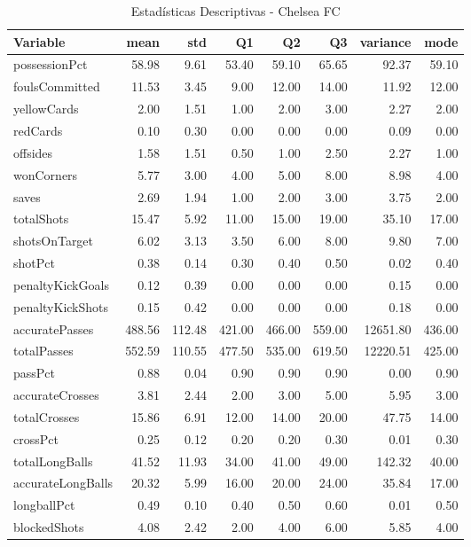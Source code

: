 \begin{table}[H]
\centering
\caption{Estadísticas Descriptivas - Chelsea FC}
\label{tab:eng_chelsea}
\small
\begin{tabular}{lrrrrrrr}
\hline
Variable & mean & std & Q1 & Q2 & Q3 & variance & mode \\
\hline
possessionPct & 58.98 & 9.61 & 53.40 & 59.10 & 65.65 & 92.37 & 59.10 \\
foulsCommitted & 11.53 & 3.45 & 9.00 & 12.00 & 14.00 & 11.92 & 12.00 \\
yellowCards & 2.00 & 1.51 & 1.00 & 2.00 & 3.00 & 2.27 & 2.00 \\
redCards & 0.10 & 0.30 & 0.00 & 0.00 & 0.00 & 0.09 & 0.00 \\
offsides & 1.58 & 1.51 & 0.50 & 1.00 & 2.50 & 2.27 & 1.00 \\
wonCorners & 5.77 & 3.00 & 4.00 & 5.00 & 8.00 & 8.98 & 4.00 \\
saves & 2.69 & 1.94 & 1.00 & 2.00 & 3.00 & 3.75 & 2.00 \\
totalShots & 15.47 & 5.92 & 11.00 & 15.00 & 19.00 & 35.10 & 17.00 \\
shotsOnTarget & 6.02 & 3.13 & 3.50 & 6.00 & 8.00 & 9.80 & 7.00 \\
shotPct & 0.38 & 0.14 & 0.30 & 0.40 & 0.50 & 0.02 & 0.40 \\
penaltyKickGoals & 0.12 & 0.39 & 0.00 & 0.00 & 0.00 & 0.15 & 0.00 \\
penaltyKickShots & 0.15 & 0.42 & 0.00 & 0.00 & 0.00 & 0.18 & 0.00 \\
accuratePasses & 488.56 & 112.48 & 421.00 & 466.00 & 559.00 & 12651.80 & 436.00 \\
totalPasses & 552.59 & 110.55 & 477.50 & 535.00 & 619.50 & 12220.51 & 425.00 \\
passPct & 0.88 & 0.04 & 0.90 & 0.90 & 0.90 & 0.00 & 0.90 \\
accurateCrosses & 3.81 & 2.44 & 2.00 & 3.00 & 5.00 & 5.95 & 3.00 \\
totalCrosses & 15.86 & 6.91 & 12.00 & 14.00 & 20.00 & 47.75 & 14.00 \\
crossPct & 0.25 & 0.12 & 0.20 & 0.20 & 0.30 & 0.01 & 0.30 \\
totalLongBalls & 41.52 & 11.93 & 34.00 & 41.00 & 49.00 & 142.32 & 40.00 \\
accurateLongBalls & 20.32 & 5.99 & 16.00 & 20.00 & 24.00 & 35.84 & 17.00 \\
longballPct & 0.49 & 0.10 & 0.40 & 0.50 & 0.60 & 0.01 & 0.50 \\
blockedShots & 4.08 & 2.42 & 2.00 & 4.00 & 6.00 & 5.85 & 4.00 \\

\end{tabular}
\end{table}
